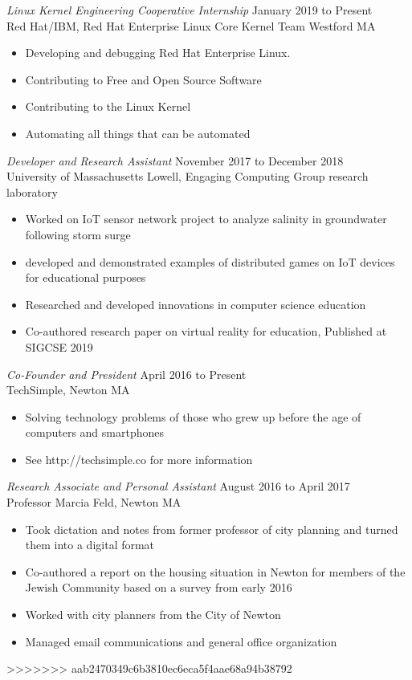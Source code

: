 \documentclass[margin]{res}
\begin{document}
\begin{resume}
{\sl Linux Kernel Engineering Cooperative Internship}
\hfill January 2019 to Present \\
Red Hat/IBM, 
Red Hat Enterprise Linux Core Kernel Team Westford MA
\begin{itemize} \itemsep -2pt
	\item Developing and debugging Red Hat Enterprise Linux. 
	\item Contributing to Free and Open Source Software
	\item Contributing to the Linux Kernel
	\item Automating all things that can be automated
\end{itemize}

{\sl Developer and Research Assistant}
\hfill November 2017 to December 2018 \\
University of Massachusetts Lowell,
Engaging Computing Group research laboratory
\begin{itemize} \itemsep -2pt
	\item Worked on IoT sensor network project to analyze salinity in
		groundwater following storm surge
	\item developed and demonstrated examples of distributed games on
		IoT devices for educational purposes
	\item Researched and developed innovations in computer science
		education
	\item Co-authored research paper on virtual reality for education,
		Published at SIGCSE 2019
\end{itemize} 
{\sl Co-Founder and President}
\hfill April 2016 to Present \\
TechSimple,
Newton MA
\begin{itemize} \itemsep -2pt
	\item Solving technology problems of those who grew up before the age
		of computers and smartphones
	\item See http://techsimple.co for more information
\end{itemize} 

{\sl Research Associate and Personal Assistant}
\hfill August 2016 to April 2017 \\
Professor Marcia Feld,
Newton MA
\begin{itemize} \itemsep -2pt
	\item Took dictation and notes from former professor of city planning
		and turned them into a digital format
	\item Co-authored a report on the housing situation in Newton for
		members of the Jewish Community based on a survey from early 2016
	\item Worked with city planners from the City of Newton
	\item Managed email communications and general office organization
\end{itemize} 
\end{resume}

>>>>>>> aab2470349c6b3810ec6eca5f4aae68a94b38792
\end{document}
